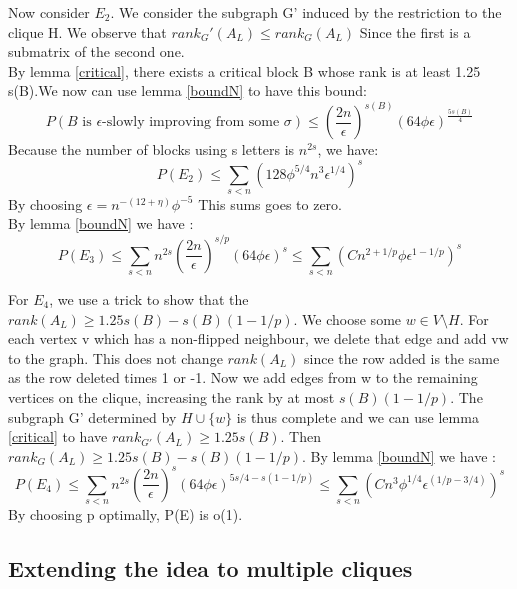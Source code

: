 \documentclass[12pt]{article}
\begin{document}
Now consider $E_2$. We consider the subgraph G' induced by the restriction to the clique H. We observe that $rank_G'(A_L) \leq rank_G(A_L)$ Since the first is a submatrix of the second one. \\
By lemma \ref{critical}, there exists a critical block B whose rank is at least 1.25 s(B).We now can use lemma \ref{boundN} to have this bound:
\begin{equation*}
P(B \text{ is }\epsilon \text {-slowly improving from some }\sigma) \leq (\frac{2n}{\epsilon})^{s(B)}(64\phi\epsilon)^{\frac{5s(B)}{4}}
\end{equation*}
Because the number of blocks using s letters is $n^{2s}$, we have:
\begin{equation*}
P(E_2) \leq  \sum_{s < n}(128\phi^{5/4}n^3\epsilon^{1/4})^s
\end{equation*}
By choosing $\epsilon = n^{-(12 + \eta)}\phi^{-5}$ This sums goes to zero.\\

By lemma \ref{boundN} we have :
\begin{equation*}
P(E_3) \leq  \sum_{s < n}n^{2s}(\dfrac{2n}{\epsilon})^{s/p}(64\phi\epsilon)^{s} \leq \sum_{s < n}(Cn^{2 + 1/p}\phi\epsilon^{1 - 1/p})^{s}
\end{equation*}

For $E_4$, we use a trick to show that the $rank(A_L) \geq 1.25s(B) - s(B)(1 - 1/p)$. We choose some $w \in V \setminus H$. For each vertex v which has a non-flipped neighbour, we delete that edge and add vw to the graph. This does not change $rank(A_L)$ since the row added is the same as the row deleted times 1 or -1. Now we add edges from w to the remaining vertices on the clique, increasing the rank by at most $s(B)(1 - 1/p)$. The subgraph G' determined by $H \cup \{w\}$ is thus complete and we can use  lemma \ref{critical} to have $rank_{G'}(A_L) \geq 1.25 s(B)$. Then $rank_G(A_L) \geq 1.25s(B) - s(B)(1 - 1/p)$.
By lemma \ref{boundN} we have :
\begin{equation*}
P(E_4) \leq  \sum_{s < n}n^{2s}(\dfrac{2n}{\epsilon})^{s}(64\phi\epsilon)^{5s/4 - s(1 - 1/p)} \leq \sum_{s < n}(Cn^{3}\phi^{1/4}\epsilon^{(1/p - 3/4)})^{s}
\end{equation*}
By choosing p optimally, P(E) is o(1). 

\subsection{Extending the idea to multiple cliques}
\end{document}

